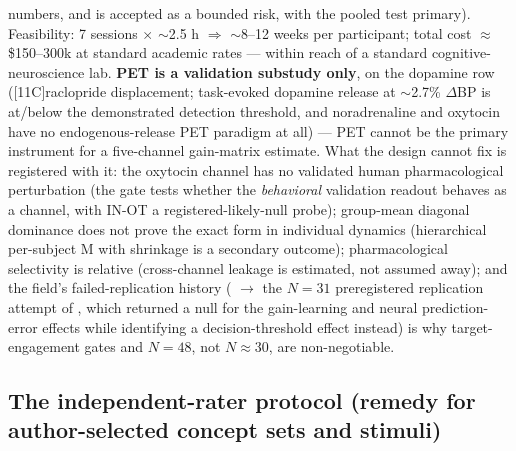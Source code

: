 \documentclass[11pt,twocolumn]{article}
\theoremstyle{plain}
\begin{document}
numbers, and is accepted as a bounded risk, with the pooled test primary). Feasibility: 7 sessions \(\times\) \(\sim\)2.5 h \(\Rightarrow\) \(\sim\)8--12 weeks per participant; total cost \(\approx\) \$150--300k at standard academic rates --- within reach of a standard cognitive-neuroscience lab. \textbf{PET is a validation substudy only}, on the dopamine row ([11C]raclopride displacement; task-evoked dopamine release at \(\sim\)2.7\% \(\Delta\)BP is at/below the demonstrated detection threshold, and noradrenaline and oxytocin have no endogenous-release PET paradigm at all) --- PET cannot be the primary instrument for a five-channel gain-matrix estimate. What the design cannot fix is registered with it: the oxytocin channel has no validated human pharmacological perturbation (the gate tests whether the \emph{behavioral} validation readout behaves as a channel, with IN-OT a registered-likely-null probe); group-mean diagonal dominance does not prove the exact form in individual dynamics (hierarchical per-subject M with shrinkage is a secondary outcome); pharmacological selectivity is relative (cross-channel leakage is estimated, not assumed away); and the field's failed-replication history (\citealp{pessiglione2006} \(\to\) the \(N = 31\) preregistered replication attempt of \citealp{chakroun2023}, which returned a null for the gain-learning and neural prediction-error effects while identifying a decision-threshold effect instead) is why target-engagement gates and \(N = 48\), not \(N \approx 30\), are non-negotiable.

\subsection{The independent-rater protocol (remedy for author-selected concept sets and stimuli)}
\label{sec:rater}
\end{document}
